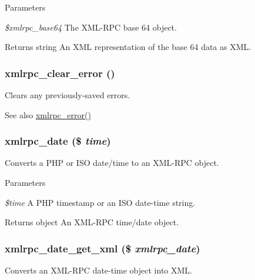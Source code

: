 \begin{DoxyParams}{Parameters}
\item[{\em \$xmlrpc\_\-base64}]The XML-\/RPC base 64 object.\end{DoxyParams}
\begin{DoxyReturn}{Returns}
string An XML representation of the base 64 data as XML. 
\end{DoxyReturn}
\hypertarget{xmlrpc_8inc_afa5cac64bc9057f6ac904b870d9c1311}{
\subsubsection[{xmlrpc\_\-clear\_\-error}]{\setlength{\rightskip}{0pt plus 5cm}xmlrpc\_\-clear\_\-error ()}}
\label{xmlrpc_8inc_afa5cac64bc9057f6ac904b870d9c1311}
Clears any previously-\/saved errors.

\begin{DoxySeeAlso}{See also}
\hyperlink{xmlrpc_8inc_aabf20dbe18bd511ce0aceedc087a15fd}{xmlrpc\_\-error()} 
\end{DoxySeeAlso}
\hypertarget{xmlrpc_8inc_a16688c083542abbf89dfd3fc63907c76}{
\subsubsection[{xmlrpc\_\-date}]{\setlength{\rightskip}{0pt plus 5cm}xmlrpc\_\-date (\$ {\em time})}}
\label{xmlrpc_8inc_a16688c083542abbf89dfd3fc63907c76}
Converts a PHP or ISO date/time to an XML-\/RPC object.


\begin{DoxyParams}{Parameters}
\item[{\em \$time}]A PHP timestamp or an ISO date-\/time string.\end{DoxyParams}
\begin{DoxyReturn}{Returns}
object An XML-\/RPC time/date object. 
\end{DoxyReturn}
\hypertarget{xmlrpc_8inc_aad3285fb3322b9452fc7b77acf4e608c}{
\subsubsection[{xmlrpc\_\-date\_\-get\_\-xml}]{\setlength{\rightskip}{0pt plus 5cm}xmlrpc\_\-date\_\-get\_\-xml (\$ {\em xmlrpc\_\-date})}}
\label{xmlrpc_8inc_aad3285fb3322b9452fc7b77acf4e608c}
Converts an XML-\/RPC date-\/time object into XML.


